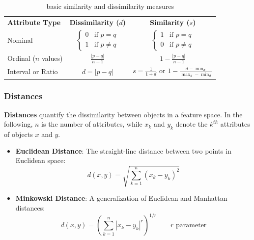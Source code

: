 \begin{table}[h]
    \centering
    \begin{tabular}{|lcc|}
        \hline
        \textbf{Attribute Type} & \textbf{Dissimilarity ($d$)} & \textbf{Similarity ($s$)} \\
        
        Nominal & $\begin{cases} 0 & \text{if } p=q \\ 1 & \text{if } p\neq q \end{cases}$ & $\begin{cases} 1 & \text{if } p=q \\ 0 & \text{if } p\neq q \end{cases}$ \\
        
        Ordinal ($n$ values) & $\frac{|p-q|}{n-1}$ & $1-\frac{|p-q|}{n-1}$ \\
        
        Interval or Ratio & $d=|p-q|$ & $s=\frac{1}{1+d} \text{ or }1-\frac{d-\min_d}{\max_d-\min_d}$\\
        \hline
    \end{tabular}
    \caption{basic similarity and dissimilarity measures}
\end{table}
\subsubsection{Distances}
\textbf{Distances} quantify the dissimilarity between objects in a feature space. In the following, $n$ is the number of attributes, while $x_k$ and $y_k$ denote the $k^{th}$ attributes of objects $x$ and $y$.

\begin{itemize}
    \item \textbf{Euclidean Distance}: The straight-line distance between two points in Euclidean space:
    \begin{equation}
    d(x,y)=\sqrt{\sum_{k=1}^{n}(x_{k}-y_{k})^{2}}        
    \end{equation}
    
    \item \textbf{Minkowski Distance}: A generalization of Euclidean and Manhattan distances:
    \begin{equation}
    d(x,y)=\left(\sum_{k=1}^{n}|x_{k}-y_{k}|^{r}\right)^{1/r}    \qquad r \text{ parameter}
    \end{equation}
\end{itemize}

